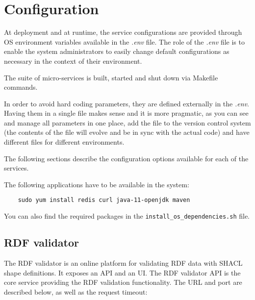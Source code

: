 \section{Configuration}
\label{sec:configuration}
At deployment and at runtime, the service configurations are provided through OS environment variables available in the \textit{.env} file. The role of the \textit{.env} file is to enable the system administrators to easily change default configurations as necessary in the context of their environment.

The suite of micro-services is built, started and shut down via Makefile commands.

In order to avoid hard coding parameters, they are defined externally in the \textit{.env}. Having them in a single file makes  sense and it is more pragmatic, as you can see and manage all parameters in one place, add the file to the version control system (the contents of the file will evolve and be in sync with the actual code) and have different files for different environments.

The following sections describe the configuration options available for each of the services.

The following applications have to be available in the system:
\begin{lstlisting}
	sudo yum install redis curl java-11-openjdk maven
\end{lstlisting}
You can also find the required packages in the \texttt{install\_os\_dependencies.sh} file.

\subsection{RDF validator}

The RDF validator is an online platform for validating RDF data with SHACL shape definitions. It exposes an API and an UI. The RDF validator API is the core service providing the RDF validation functionality. The URL and port are described below, as well as the request timeout:

